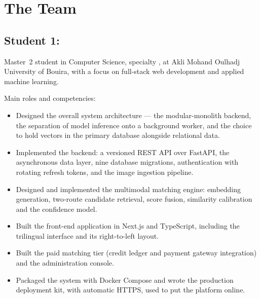 \section{The Team}

\subsection{Student 1: \thesisstudentone}

Master~2 student in Computer Science, specialty \thesisspecialty{}, at Akli
Mohand Oulhadj University of Bouira, with a focus on full-stack web development
and applied machine learning.

Main roles and competencies:

\begin{itemize}[leftmargin=1.4em,itemsep=3pt]
  \item Designed the overall system architecture --- the modular-monolith
        backend, the separation of model inference onto a background worker, and
        the choice to hold vectors in the primary database alongside relational
        data.
  \item Implemented the backend: a versioned REST API over FastAPI, the
        asynchronous data layer, nine database migrations, authentication with
        rotating refresh tokens, and the image ingestion pipeline.
  \item Designed and implemented the multimodal matching engine: embedding
        generation, two-route candidate retrieval, score fusion, similarity
        calibration and the confidence model.
  \item Built the front-end application in Next.js and TypeScript, including the
        trilingual interface and its right-to-left layout.
  \item Built the paid matching tier (credit ledger and payment gateway
        integration) and the administration console.
  \item Packaged the system with Docker Compose and wrote the production
        deployment kit, with automatic HTTPS, used to put the platform
        online.
\end{itemize}


